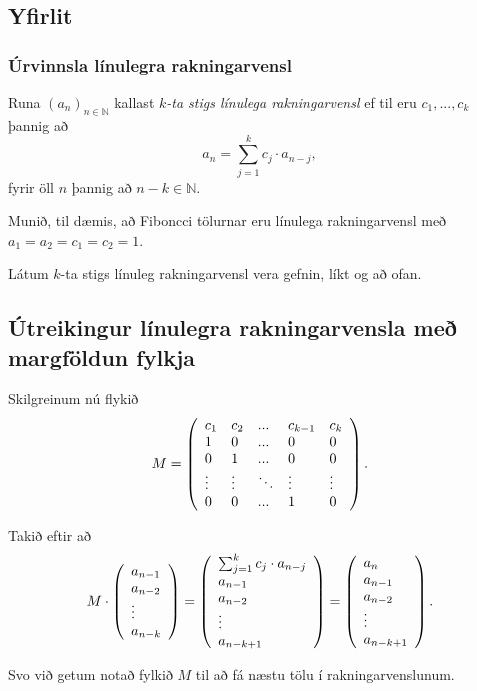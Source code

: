 \subsection{Yfirlit}
{
    \frametitle{Úrvinnsla línulegra rakningarvensl}
    {
        \item<1-> Runa $(a_n)_{n \in \mathbb{N}}$ kallast \emph{$k$-ta stigs línulega rakningarvensl} ef til eru $c_1, ..., c_k$ þannig að
        \[
            a_n = \sum_{j = 1}^k c_j \cdot a_{n - j},
        \]
        fyrir öll $n$ þannig að $n - k \in \mathbb{N}$.
        \item<2-> Munið, til dæmis, að Fiboncci tölurnar eru línulega rakningarvensl með $a_1 = a_2 = c_1 = c_2 = 1$.
        \item<3-> Látum $k$-ta stigs línuleg rakningarvensl vera gefnin, líkt og að ofan.
    }
}

\subsection{Útreikingur línulegra rakningarvensla með margföldun fylkja}
{
    {
        \item<1-> Skilgreinum nú flykið
        \[
            M = \left (
            \env{array}
            { {l l l l l}
                c_1 & c_2 & ... & c_{k - 1} & c_k\\
                1 & 0 & ... & 0 & 0\\
                0 & 1 & ... & 0 & 0\\
                \vdots & \vdots & \ddots & \vdots & \vdots\\
                0 & 0 & ... & 1 & 0
            }
            \right ).
        \]
        \item<2-> Takið eftir að
        \[
            M
            \cdot
            \left (
            \env{array}
            { {l}
                a_{n - 1}\\
                a_{n - 2}\\
                \vdots\\
                a_{n - k}
            }
            \right )
            =
            \left (
            \env{array}
            { {l}
                \sum_{j = 1}^k c_j \cdot a_{n - j}\\
                a_{n - 1}\\
                a_{n - 2}\\
                \vdots\\
                a_{n - k + 1}
            }
            \right )
            =
            \left (
            \env{array}
            { {l}
                a_n\\
                a_{n - 1}\\
                a_{n - 2}\\
                \vdots\\
                a_{n - k + 1}
            }
            \right ).
        \]
        \item<3-> Svo við getum notað fylkið $M$ til að fá næstu tölu í rakningarvenslunum.
    }
}

